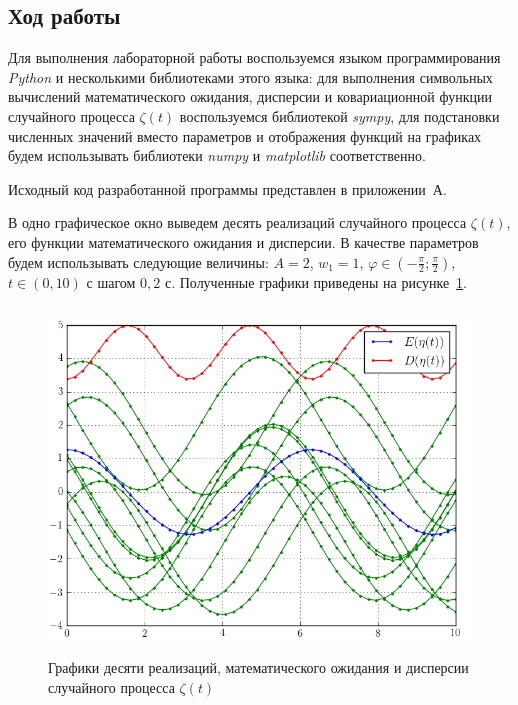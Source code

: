 \subsection{Ход работы}

Для выполнения лабораторной работы воспользуемся языком программирования
\textit{Python} и несколькими библиотеками этого языка:
для выполнения символьных вычислений математического ожидания, дисперсии и
ковариационной функции случайного процесса $ \zeta(t) $ воспользуемся библиотекой
\textit{sympy}, для подстановки численных значений вместо параметров и отображения функций
на графиках будем использывать библиотеки \textit{numpy} и \textit{matplotlib} соответственно.

Исходный код разработанной программы представлен в приложении~А.


В одно графическое окно выведем десять реализаций случайного процесса $ \zeta(t) $,
его функции математического ожидания и дисперсии. В качестве параметров будем использывать
следующие величины: $ A = 2 $, $ w_1 = 1 $, $ \varphi \in (-\frac{\pi}{2}; \frac{\pi}{2}) $,
$ t \in (0, 10) $ с шагом $ 0{,}2 $ с. Полученные графики приведены на рисунке~\ref{pic:values}.
\begin{figure}[h]
  \centering
  \includegraphics[width=150mm, height=92mm]{pic/values}
  \caption{Графики десяти реализаций, математического ожидания и дисперсии случайного процесса $ \zeta(t) $}
  \label{pic:values} 
\end{figure}

\pagebreak

